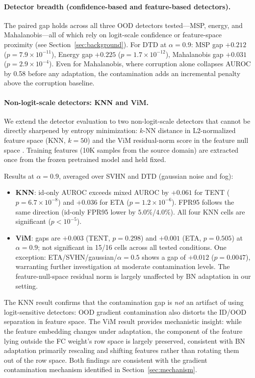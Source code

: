 \paragraph{Detector breadth (confidence-based and feature-based detectors).}
The paired gap holds across all three OOD detectors tested---MSP, energy, and Mahalanobis---all of which rely on logit-scale confidence or feature-space proximity (see Section~\ref{sec:background}).
For DTD at $\alpha = 0.9$: MSP gap $+0.212$ ($p = 7.9 \times 10^{-11}$), Energy gap $+0.225$ ($p = 1.7 \times 10^{-12}$), Mahalanobis gap $+0.031$ ($p = 2.9 \times 10^{-4}$).
Even for Mahalanobis, where corruption alone collapses AUROC by 0.58 before any adaptation, the contamination adds an incremental penalty above the corruption baseline.

\paragraph{Non-logit-scale detectors: KNN and ViM.}
We extend the detector evaluation to two non-logit-scale detectors that cannot be directly sharpened by entropy minimization: $k$-NN distance in L2-normalized feature space \citep{knn_ood} (KNN, $k{=}50$) and the ViM residual-norm score in the feature null space \citep{vim}.
Training features (10K samples from the source domain) are extracted once from the frozen pretrained model and held fixed.

Results at $\alpha = 0.9$, averaged over SVHN and DTD (gaussian noise and fog):

\begin{itemize}[leftmargin=*,topsep=2pt,itemsep=1pt]
  \item \textbf{KNN}: id-only AUROC exceeds mixed AUROC by $+0.061$ for TENT ($p = 6.7 \times 10^{-8}$) and $+0.036$ for ETA ($p = 1.2 \times 10^{-6}$). FPR95 follows the same direction (id-only FPR95 lower by $5.0\%$/$4.0\%$). All four KNN cells are significant ($p < 10^{-5}$).
  \item \textbf{ViM}: gaps are $+0.003$ (TENT, $p = 0.298$) and $+0.001$ (ETA, $p = 0.505$) at $\alpha = 0.9$; not significant in 15/16 cells across all tested conditions. One exception: ETA/SVHN/gaussian/$\alpha{=}0.5$ shows a gap of $+0.012$ ($p = 0.0047$), warranting further investigation at moderate contamination levels. The feature-null-space residual norm is largely unaffected by BN adaptation in our setting.
\end{itemize}

The KNN result confirms that the contamination gap is \emph{not} an artifact of using logit-sensitive detectors: OOD gradient contamination also distorts the ID/OOD separation in feature space.
The ViM result provides mechanistic insight: while the feature embedding changes under adaptation, the component of the feature lying outside the FC weight's row space is largely preserved, consistent with BN adaptation primarily rescaling and shifting features rather than rotating them out of the row space.
Both findings are consistent with the gradient contamination mechanism identified in Section~\ref{sec:mechanism}.

